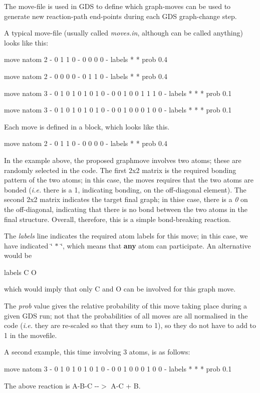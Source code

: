 The move-\/file is used in G\+DS to define which graph-\/moves can be used to generate new reaction-\/path end-\/points during each G\+DS graph-\/change step.

A typical move-\/file (usually called {\itshape moves.\+in}, although can be called anything) looks like this\+:

\begin{DoxyVerb}move
natom 2
-
0 1
1 0
-
0 0
0 0
-
labels * *
prob 0.4

move
natom 2
-
0 0
0 0
-
0 1
1 0
-
labels * *
prob 0.4

move
natom 3
-
0 1 0
1 0 1
0 1 0
-
0 0 1
0 0 1
1 1 0
-
labels * * *
prob 0.1

move
natom 3
-
0 1 0
1 0 1
0 1 0
-
0 0 1
0 0 0
1 0 0
-
labels * * *
prob 0.1
\end{DoxyVerb}


Each move is defined in a block, which looks like this. \begin{DoxyVerb}move
natom 2
-
0 1
1 0
-
0 0
0 0
-
labels * *
prob 0.4
\end{DoxyVerb}


In the example above, the proposed graphmove involves two atoms; these are randomly selected in the code. The first 2x2 matrix is the required bonding pattern of the two atoms; in this case, the moves requires that the two atoms are bonded ({\itshape i.\+e.} there is a 1, indicating bonding, on the off-\/diagonal element). The second 2x2 matrix indicates the target final graph; in thise case, there is a {\itshape 0} on the off-\/diagonal, indicating that there is no bond between the two atoms in the final structure. Overall, therefore, this is a simple bond-\/breaking reaction.

The {\itshape labels} line indicates the required atom labels for this move; in this case, we have indicated \char`\"{} $\ast$ \char`\"{}, which means that {\bfseries{any}} atom can participate. An alternative would be \begin{DoxyVerb}labels C O
\end{DoxyVerb}


which would imply that only C and O can be involved for this graph move.

The {\itshape prob} value gives the relative probability of this move taking place during a given G\+DS run; not that the probabilities of all moves are all normalised in the code ({\itshape i.\+e.} they are re-\/scaled so that they sum to 1), so they do not have to add to 1 in the movefile.

A second example, this time involving 3 atoms, is as follows\+:

\begin{DoxyVerb}move
natom 3
-
0 1 0
1 0 1
0 1 0
-
0 0 1
0 0 0
1 0 0
-
labels * * *
prob 0.1
\end{DoxyVerb}


The above reaction is A-\/\+B-\/C -\/-\/$>$ A-\/C + B. 